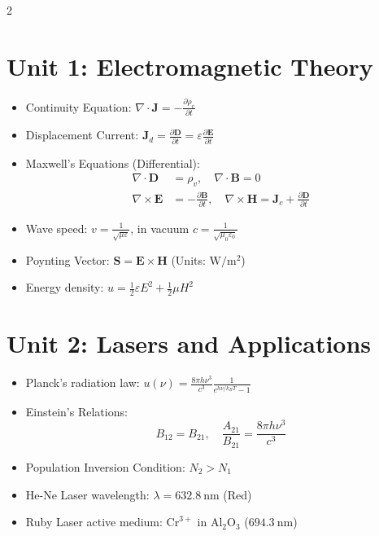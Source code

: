 \begin{multicols}{2}
{\section*{Unit 1: Electromagnetic Theory}
\begin{itemize}[leftmargin=*]
    \item Continuity Equation: $\nabla \cdot \mathbf{J} = -\frac{\partial \rho_v}{\partial t}$
    \item Displacement Current: $\mathbf{J}_d = \frac{\partial \mathbf{D}}{\partial t} = \varepsilon \frac{\partial \mathbf{E}}{\partial t}$
    \item Maxwell's Equations (Differential):
    \begin{align*}
    \nabla \cdot \mathbf{D} &= \rho_v, \quad \nabla \cdot \mathbf{B} = 0 \\
    \nabla \times \mathbf{E} &= -\frac{\partial \mathbf{B}}{\partial t}, \quad \nabla \times \mathbf{H} = \mathbf{J}_c + \frac{\partial \mathbf{D}}{\partial t}
    \end{align*}
    \item Wave speed: $v = \frac{1}{\sqrt{\mu \varepsilon}}$, in vacuum $c = \frac{1}{\sqrt{\mu_0 \varepsilon_0}}$
    \item Poynting Vector: $\mathbf{S} = \mathbf{E} \times \mathbf{H}$ (Units: $\si{\watt\per\meter\squared}$)
    \item Energy density: $u = \frac{1}{2}\varepsilon E^2 + \frac{1}{2}\mu H^2$
\end{itemize}

\section*{Unit 2: Lasers and Applications}
\begin{itemize}[leftmargin=*]
    \item Planck's radiation law: $u(\nu) = \frac{8\pi h \nu^3}{c^3} \frac{1}{e^{h\nu/k_B T} - 1}$
    \item Einstein's Relations:
    \[
    B_{12} = B_{21}, \quad \frac{A_{21}}{B_{21}} = \frac{8\pi h \nu^3}{c^3}
    \]
    \item Population Inversion Condition: $N_2 > N_1$
    \item He-Ne Laser wavelength: $\lambda = \SI{632.8}{\nano\meter}$ (Red)
    \item Ruby Laser active medium: $\text{Cr}^{3+}$ in $\text{Al}_2\text{O}_3$ ($\SI{694.3}{\nano\meter}$)
\end{itemize}

}
\end{multicols}
